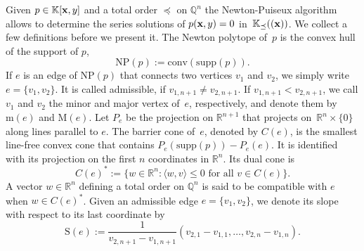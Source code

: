 \documentclass[a4paper,draft]{amsart}
\theoremstyle{definition}
\begin{document}
Given $p\in\mathbb{K}[\bold{x},y]$ and a total order $\preceq$ on $\mathbb{Q}^n$ the Newton-Puiseux algorithm allows to determine the series solutions of $p(\bold{x},y) = 0$ in~$\mathbb{K}_\preceq((\bold{x}))$.
We collect a few definitions before we present it. The Newton polytope of~$p$ is the convex hull of the support of $p$,
 \begin{equation*}
\mathrm{NP}(p) := \mathrm{conv}(\mathrm{supp}(p)).
\end{equation*}
If $e$ is an edge of $\mathrm{NP}(p)$ that connects two vertices $v_1$ and $v_2$, we simply write $e = \{v_1,v_2\}$. It is called admissible, if $v_{1,n+1}\neq v_{2,n+1}$. If $v_{1,n+1} < v_{2,n+1}$, we call $v_1$ and $v_2$ the minor and major vertex of~$e$, respectively, and denote them by~$\mathrm{m}(e)$ and $\mathrm{M}(e)$. Let $P_e$ be the projection on $\mathbb{R}^{n+1}$ that projects on~$\mathbb{R}^n\times \{0\}$ along lines parallel to $e$. The barrier cone of~$e$, denoted by $C(e)$, is the smallest line-free convex cone that contains $P_e(\mathrm{supp}(p)) - P_e(e)$. It is identified with its projection on the first $n$ coordinates in $\mathbb{R}^n$. Its dual cone is
\begin{equation*}
C(e)^* := \{ w\in \mathbb{R}^n : \langle w,v \rangle \leq 0 \text{ for all } v \in C(e) \}.
\end{equation*}
A vector $w\in\mathbb{R}^n$ defining a total order on $\mathbb{Q}^n$ is said to be compatible with $e$ when $w\in C(e)^*$.
Given an admissible edge $e = \{v_1,v_2\}$, we denote its slope with respect to its last coordinate by
\begin{equation*}
\mathrm{S}(e):= \frac{1}{v_{2,n+1}-v_{1,n+1}}(v_{2,1}-v_{1,1},\dots,v_{2,n}-v_{1,n}).
\end{equation*}
\end{document}
